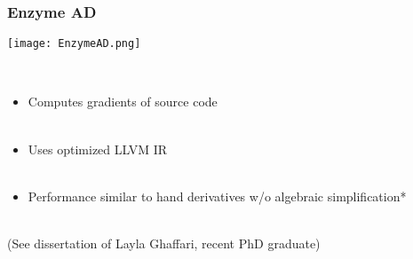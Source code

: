 \documentclass{beamer}
\begin{document}

\begin{frame}
\begin{center}
\frametitle{Enzyme AD}

\texttt{[image: EnzymeAD.png]}

~\\

\begin{itemize}

\item Computes gradients of source code\\

~\\

\item Uses optimized LLVM IR\\

~\\

\item Performance similar to hand derivatives w/o algebraic simplification*\\

\end{itemize}

~\\

(See dissertation of Layla Ghaffari, recent PhD graduate)

\end{center}
\end{frame}

\end{document}
